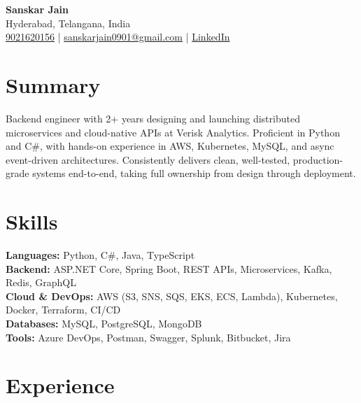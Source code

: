 \documentclass[a4paper,10pt]{article}
\begin{document}
\begin{center}
    {\LARGE \textbf{Sanskar Jain}} \\
    Hyderabad, Telangana, India \\
    \href{tel:9021620156}{9021620156} \;|\;
    \href{mailto:sanskarjain0901@gmail.com}{sanskarjain0901@gmail.com} \;|\;
    \href{https://www.linkedin.com/in/sanskar-jain0901/}{LinkedIn}
\end{center}

\vspace{3pt}

\section*{Summary}
Backend engineer with 2+ years designing and launching distributed microservices and cloud-native APIs at Verisk Analytics.
Proficient in Python and C\#, with hands-on experience in AWS, Kubernetes, MySQL, and async event-driven architectures.
Consistently delivers clean, well-tested, production-grade systems end-to-end, taking full ownership from design through deployment.

\section*{Skills}
\textbf{Languages:} Python, C\#, Java, TypeScript \\
\textbf{Backend:} ASP.NET Core, Spring Boot, REST APIs, Microservices, Kafka, Redis, GraphQL \\
\textbf{Cloud \& DevOps:} AWS (S3, SNS, SQS, EKS, ECS, Lambda), Kubernetes, Docker, Terraform, CI/CD \\
\textbf{Databases:} MySQL, PostgreSQL, MongoDB \\
\textbf{Tools:} Azure DevOps, Postman, Swagger, Splunk, Bitbucket, Jira

\section*{Experience}
\end{document}
